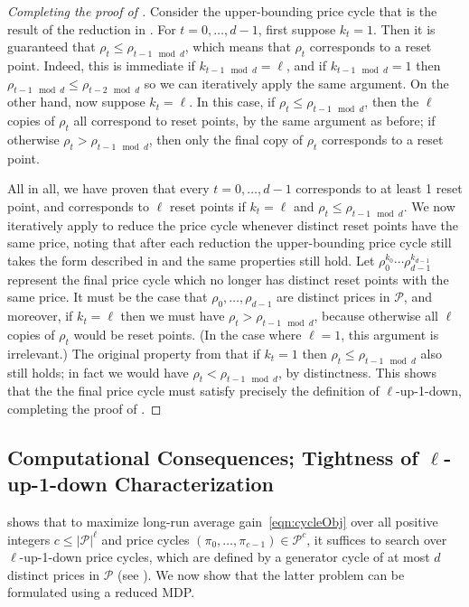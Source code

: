 \documentclass[format=acmsmall, review=false]{acmart}
\newcommand{\cP}{\mathcal{P}}
\newcommand{\luid}{$\ell$-up-1-down\xspace}
\begin{document}
\begin{proof}[Completing the proof of ]
Consider the upper-bounding price cycle that is the result of the reduction in .
For $t=0,\ldots,d-1$, first suppose $k_t=1$.  Then it is guaranteed that $\rho_t\le\rho_{t-1\mod d}$, which means that $\rho_t$ corresponds to a reset point.  Indeed, this is immediate if $k_{t-1\mod d}=\ell$, and if $k_{t-1\mod d}=1$ then $\rho_{t-1\mod d}\le\rho_{t-2\mod d}$ so we can iteratively apply the same argument.  On the other hand, now suppose $k_t=\ell$.  In this case, if $\rho_t\le\rho_{t-1\mod d}$, then the $\ell$ copies of $\rho_t$ all correspond to reset points, by the same argument as before; if otherwise $\rho_t>\rho_{t-1\mod d}$, then only the final copy of $\rho_t$ corresponds to a reset point.

All in all, we have proven that every $t=0,\ldots,d-1$ corresponds to at least 1 reset point, and corresponds to $\ell$ reset points if $k_t=\ell$ and $\rho_t\le\rho_{t-1\mod d}$.
We now iteratively apply  to reduce the price cycle whenever distinct reset points have the same price, noting that after each reduction the upper-bounding price cycle still takes the form described in  and the same properties still hold.
Let $\rho_0^{k_0}\cdots\rho_{d-1}^{k_{d-1}}$ represent the final price cycle which no longer has distinct reset points with the same price.
It must be the case that $\rho_0,\ldots,\rho_{d-1}$ are distinct prices in $\cP$, and moreover, if $k_t=\ell$ then we must have $\rho_t>\rho_{t-1\mod d}$, because otherwise all $\ell$ copies of $\rho_t$ would be reset points.  (In the case where $\ell=1$, this argument is irrelevant.)  The original property from  that if $k_t=1$ then $\rho_t\le\rho_{t-1\mod d}$ also still holds; in fact we would have $\rho_t<\rho_{t-1\mod d}$, by distinctness.  This shows that the the final price cycle must satisfy precisely the definition of \luid, completing the proof of .
\end{proof}

\subsection{Computational Consequences; Tightness of \luid Characterization} \label{sec:theoryLooseEnds}

 shows that to maximize long-run average gain~\eqref{eqn:cycleObj} over all positive integers $c\le|\cP|^\ell$ and price cycles $(\pi_0,\ldots,\pi_{c-1})\in\cP^c$, it suffices to search over \luid price cycles, which are defined by a generator cycle of at most $d$ distinct prices in $\cP$ (see ).  We now show that the latter problem can be formulated using a reduced MDP.
\end{document}
